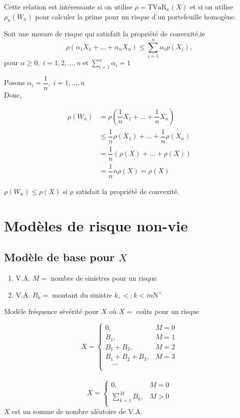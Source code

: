 \documentclass[]{book}
\theoremstyle{definition}
\theoremstyle{definition}
\theoremstyle{definition}
\theoremstyle{remark}
\begin{document}
Cette relation est intéressante si on utilise
\(\rho=\text{TVaR}_\kappa (X)\) et si on utilise \(\rho_\kappa(W_n)\)
pour calculer la prime pour un risque d'un portefeuille homogène.

Soit une mesure de risque qui satisfait la propriété de convexité,ie \[
\rho(\alpha_1 X_1+\dots + \alpha_n X_n) \leq \sum^n_{i=1} \alpha_i\rho\left (X_i\right ),
\] pour
\(\alpha \geq 0,\;i=1,2,\dots,n\;\text{et}\;\sum^n_{i=1} \alpha_i=1\)

Posons \(\alpha_i=\dfrac{1}{n},\;i=1,\dots,n\)\\
Donc,

\begin{align*}
\rho(W_n)& = \rho(\dfrac{1}{n}X_1+\dots+\dfrac{1}{n} X_n)\\
& \leq \dfrac{1}{n} \rho(X_1)+\dots+\dfrac{1}{n}\rho(X_n)\\
& =\dfrac{1}{n}(\rho(X)+\dots+\rho(X))\\
& =\dfrac{1}{n}n \rho(X) = \rho(X)
\end{align*}

\(\rho(W_n)\leq \rho(X)\) si \(\rho\) satisfait la propriété de
convexité.

\chapter*{Modèles de risque non-vie}\label{modeles-de-risque-non-vie}

\section{\texorpdfstring{Modèle de base pour
\(X\)}{Modèle de base pour X}}\label{modele-de-base-pour-x}

\begin{enumerate}
\item V.A. $M=$ nombre de sinistres pour un risque  
\item V.A. $B_k=$ montant du sinistre $k,<;k<in\mathrm{N}^+$
\end{enumerate}

Modèle fréquence sévérité pour \(X\) où \(X=\) coûts pour un risque

\[
X=\begin{cases}
0,& M=0\\
B_1,& M=1\\
B_1+B_2,& M=2\\
B_1+B_2+B_3,& M=3\\
\quad\cdots\\
\end{cases}
\]\\
\[
X=\begin{cases}
0,& M=0\\
\sum^M_{k=1}B_k,& M > 0\\
\end{cases}
\] \(X\) est un somme de nombre aléatoire de V.A.
\end{document}

